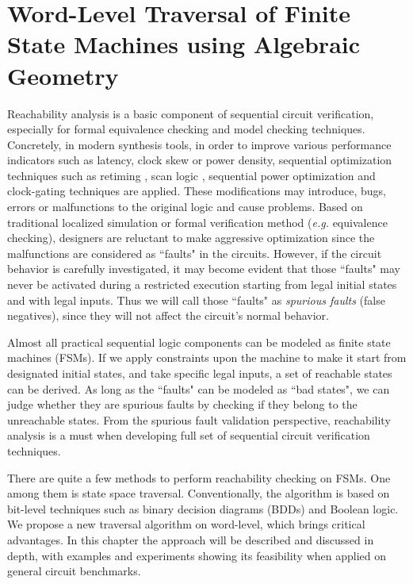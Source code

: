 \chapter{Word-Level Traversal of Finite State Machines using Algebraic Geometry}
\label{ch:reacha}
Reachability analysis is a basic component of sequential circuit verification, especially for 
formal equivalence checking and model checking techniques. Concretely, in modern synthesis 
tools, in order to improve various performance indicators such as latency, clock skew or power
density, sequential optimization techniques such as retiming \cite{retiming}, scan logic \cite{scan},
sequential power optimization \cite{mathur2009power} and clock-gating techniques \cite{clockgating} are applied.
These modifications may introduce, bugs, errors or malfunctions to the original logic and cause problems. 
Based on traditional localized simulation or formal verification method ({\it e.g.} equivalence checking), 
designers are reluctant to make aggressive optimization
since the malfunctions are considered as ``faults" in the circuits.
However, if the circuit behavior is carefully investigated, it may become evident that 
those ``faults" may never be activated during a restricted execution starting 
from legal initial states and with legal inputs. Thus we will call those ``faults" as 
{\it spurious faults} (false negatives), since they will not affect the circuit's normal behavior.

Almost all practical sequential logic components can be modeled as finite state machines (FSMs). 
If we apply constraints upon the machine to make it start from designated initial states, and 
take specific legal inputs, a set of reachable states can be derived. 
As long as the ``faults" can be modeled as ``bad states", we can judge whether they are 
spurious faults by checking if they belong to the unreachable states. From the spurious fault validation 
perspective, reachability analysis is a must when developing full set of sequential circuit verification
techniques.

There are quite a few methods to perform reachability checking on FSMs. One among them is 
state space traversal. Conventionally, the algorithm is based on bit-level techniques such as
binary decision diagrams (BDDs) and Boolean logic. We propose a new traversal algorithm on word-level,
which brings critical advantages. In this chapter the approach will be described and discussed in depth, 
with examples and experiments showing its feasibility when applied on general circuit benchmarks.

